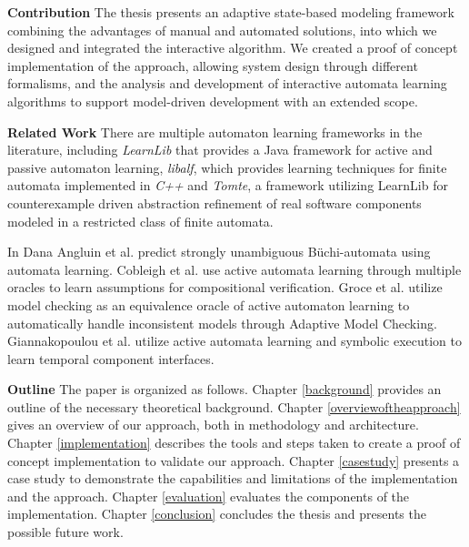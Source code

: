\textbf{Contribution} The thesis presents an adaptive state-based modeling framework combining the advantages of manual and automated solutions, into which we designed and integrated the interactive algorithm. We created a proof of concept implementation of the approach, allowing system design through different formalisms, and the analysis and development of interactive automata learning algorithms to support model-driven development with an extended scope.
\clearpage

\textbf{Related Work} There are multiple automaton learning frameworks in the literature, including
\emph{LearnLib}\cite{10.1007/978-3-319-21690-4_32} that provides a Java framework for active and passive automaton learning, \emph{libalf}, which provides learning techniques for finite automata implemented in \emph{C++} and \emph{Tomte}\cite{aarts2012automata}, a framework utilizing LearnLib for counterexample driven abstraction refinement of real software components modeled in a restricted class of finite automata.

In \cite{angluin2020strongly} Dana Angluin et al. predict strongly unambiguous Büchi-automata using automata learning. Cobleigh et al. use active automata learning through multiple oracles to learn assumptions for compositional verification\cite{cobleigh2003learning}. Groce et al. utilize model checking as an equivalence oracle of active automaton learning to automatically handle inconsistent models through Adaptive Model Checking\cite{groce2002adaptive}. Giannakopoulou et al. utilize active automata learning and symbolic execution to learn temporal component interfaces\cite{giannakopoulou2012symbolic}.


\textbf{Outline} The paper is organized as follows. Chapter \ref{background} provides an outline of the necessary theoretical background. Chapter \ref{overviewoftheapproach} gives an overview of our approach, both in methodology and architecture. Chapter \ref{implementation} describes the tools and steps taken to create a proof of concept implementation to validate our approach. Chapter \ref{casestudy} presents a case study to demonstrate the capabilities and limitations of the implementation and the approach. Chapter \ref{evaluation} evaluates the components of the implementation. Chapter \ref{conclusion} concludes the thesis and presents the possible future work.




